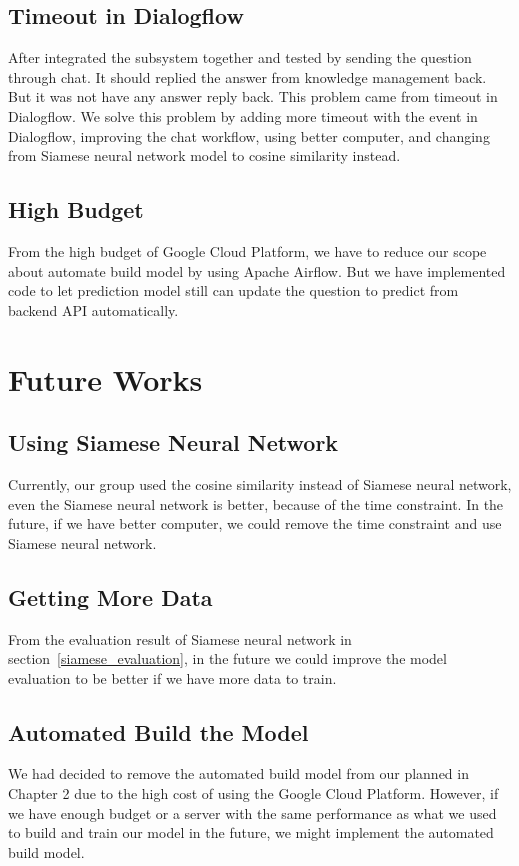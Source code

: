 \documentclass[12pt,oneside,openright,a4paper]{cpe-english-project}
\begin{document}
\subsection{Timeout in Dialogflow}
\label{ch5_timeout_dialogflow}
After integrated the subsystem together and tested by sending the question through chat.
It should replied the answer from knowledge management back.
But it was not have any answer reply back. This problem came from timeout in Dialogflow.
We solve this problem by adding more timeout with the event in Dialogflow, improving the
chat workflow, using better computer,
and changing from Siamese neural network model to cosine similarity instead.

\subsection{High Budget}
From the high budget of Google Cloud Platform, we have to reduce our scope about automate build model
by using Apache Airflow. But we have implemented code to let prediction model still can update the
question to predict from backend API automatically.

\section{Future Works}
\subsection{Using Siamese Neural Network}
Currently, our group used the cosine similarity instead of Siamese neural network, even the Siamese neural network is better, because of the time constraint. In the future, if we have better computer, we could remove the time constraint and use Siamese neural network.

\subsection{Getting More Data}
From the evaluation result of Siamese neural network in section~\ref*{siamese_evaluation},
in the future we could improve the model evaluation to be better if we have more data to train.

\subsection{Automated Build the Model}
We had decided to remove the automated build model from our planned in Chapter 2
due to the high cost of using the Google Cloud Platform.
However, if we have enough budget or a server with the same performance
as what we used to build and train our model in the future,
we might implement the automated build model.
\end{document}
